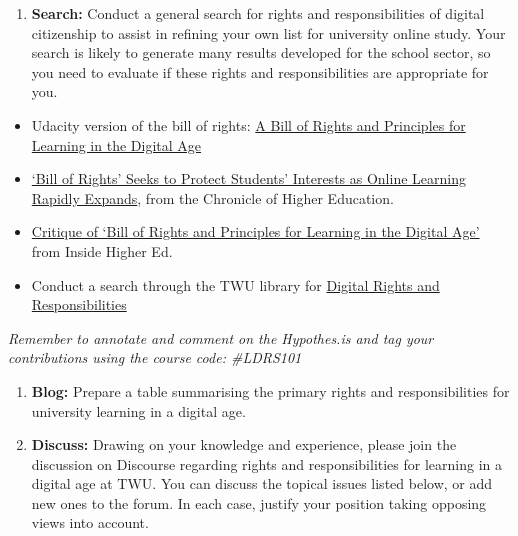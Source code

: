 \documentclass[
]{book}
\providecommand{\tightlist}{%
  \setlength{\itemsep}{0pt}\setlength{\parskip}{0pt}}
\theoremstyle{definition}
\theoremstyle{definition}
\theoremstyle{definition}
\theoremstyle{definition}
\theoremstyle{remark}
\begin{document}
\begin{reflect}
\begin{enumerate}
\def\labelenumi{\arabic{enumi}.}
\tightlist
\item
  \textbf{Search:} Conduct a general search for rights and responsibilities of digital citizenship to assist in refining your own list for university online study. Your search is likely to generate many results developed for the school sector, so you need to evaluate if these rights and responsibilities are appropriate for you.
\end{enumerate}

\begin{itemize}
\item
  Udacity version of the bill of rights: \href{https://www.udacity.com/blog/2013/01/a-bill-of-rights-and-principles-for.html}{A Bill of Rights and Principles for Learning in the Digital Age}
\item
  \href{https://www.chronicle.com/article/bill-of-rights-seeks-to-protect-students-interests-as-online-learning-rapidly-expands/}{`Bill of Rights' Seeks to Protect Students' Interests as Online Learning Rapidly Expands}, from the Chronicle of Higher Education.\\
\item
  \href{https://www.insidehighered.com/blogs/law-policy-and-it/critique-bill-rights-and-principles-learning-digital-age}{Critique of `Bill of Rights and Principles for Learning in the Digital Age'} from Inside Higher Ed.
\item
  Conduct a search through the TWU library for \href{https://twu.idm.oclc.org/login?url=https://search.ebscohost.com/login.aspx?direct=true\&bquery=digital+rights+and+responsibility\&cli0=FT1\&clv0=Y\&type=0\&searchMode=And\&site=eds-live\&scope=site}{Digital Rights and Responsibilities}
\end{itemize}

\emph{Remember to annotate and comment on the Hypothes.is and tag your contributions using the course code: \#LDRS101}

\begin{enumerate}
\def\labelenumi{\arabic{enumi}.}
\setcounter{enumi}{1}
\item
  \textbf{Blog:} Prepare a table summarising the primary rights and responsibilities for university learning in a digital age.
\item
  \textbf{Discuss:} Drawing on your knowledge and experience, please join the discussion on Discourse regarding rights and responsibilities for learning in a digital age at TWU. You can discuss the topical issues listed below, or add new ones to the forum. In each case, justify your position taking opposing views into account.
\end{enumerate}


\end{reflect}
\end{document}
